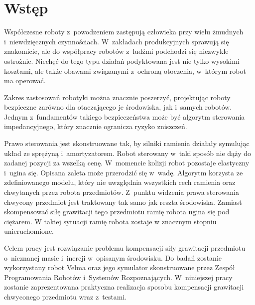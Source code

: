 
\chapter{Wstęp\label{chap:wstep}}

	Współczesne roboty z~powodzeniem zastępują człowieka przy wielu żmudnych i~niewdzięcznych czynnościach.  W~zakładach produkcyjnych sprawują się znakomicie, ale do współpracy robotów z~ludźmi podchodzi się niezwykle ostrożnie. Niechęć do tego typu działań podyktowana jest nie tylko wysokimi kosztami, ale także obawami związanymi z~ochroną otoczenia, w~którym robot ma operować.
	
	Zakres zastosowań robotyki można znacznie poszerzyć, projektując roboty bezpieczne zarówno dla otaczającego je środowiska, jak i~samych robotów. Jednym z~fundamentów takiego bezpieczeństwa może być algorytm sterowania impedancyjnego, który znacznie ogranicza ryzyko zniszczeń. 
	
	Prawo sterowania jest skonstruowane tak, by silniki ramienia działały symulując układ ze sprężyną i~amortyzatorem. Robot sterowany w~taki sposób nie dąży do zadanej pozycji za wszelką cenę. W~momencie kolizji robot pozostaje elastyczny i~ugina się. Opisana zaleta może przerodzić się w~wadę. Algorytm korzysta ze zdefiniowanego modelu, który nie uwzględnia wszystkich cech ramienia oraz chwytanych przez robota przedmiotów. Z~punktu widzenia prawa sterowania chwycony przedmiot jest traktowany tak samo jak reszta środowiska. Zamiast skompensować siłę grawitacji tego przedmiotu ramię robota ugina się pod ciężarem. W takiej sytuacji ramię robota zostaje w znacznym stopniu unieruchomione. 

	Celem pracy jest rozwiązanie problemu kompensacji siły grawitacji przedmiotu o~nieznanej masie i~inercji w~opisanym środowisku. 
	Do badań zostanie wykorzystany robot Velma oraz jego symulator skonstruowane przez Zespół Programowania Robotów i~Systemów Rozpoznających. W~niniejszej pracy zostanie zaprezentowana praktyczna realizacja sposobu kompensacji grawitacji chwyconego przedmiotu wraz z~testami.
